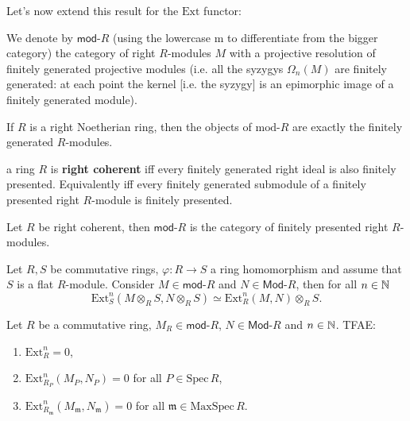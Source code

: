 Let's now extend this result for the $\mathrm{Ext}$ functor:
\begin{defn}
	We denote by $\mathsf{mod}\text{-}R$ (using the lowercase m to differentiate from the
	bigger category) the category of right $R$-modules $M$ with a projective
	resolution of finitely generated projective modules
	(i.e. all the syzygys $\Omega_n(M)$ are finitely generated:
	at each point the kernel [i.e. the syzygy] is an epimorphic image of a finitely generated module).
\end{defn}

\begin{rem}[]
	If $R$ is a right Noetherian ring, then
	the objects of $\mathrm{mod}\text{-}R$ are exactly the finitely generated $R$-modules.
\end{rem}

\begin{defn}
	a ring $R$ is \textbf{right coherent} iff every finitely generated right ideal
	is also finitely presented.
	Equivalently iff every finitely generated submodule of a finitely
	presented right $R$-module is finitely presented.
\end{defn}
\begin{rem}[]
	Let $R$ be right coherent, then
	$\mathsf{mod}\text{-}R$ is the category of finitely presented right $R$-modules.
\end{rem}

\begin{prop}
	Let $R,S$ be commutative rings, $\varphi: R \to S$ a ring homomorphism
	and assume that $S$ is a flat $R$-module.
	Consider $M \in \mathsf{mod}\text{-}R$ and $N \in \mathsf{Mod}\text{-}R$,
	then for all $n \in \mathbb{N}$
	\begin{equation}
		\mathrm{Ext}^n_S \left( M \otimes_R S, N \otimes_R S \right) \simeq
		\mathrm{Ext}^n_R \left( M,N \right) \otimes_R S
	.\end{equation} 
\end{prop} 

\begin{cor}
	Let $R$ be a commutative ring,
	$M_R \in \mathsf{mod}\text{-}R$, $N \in \mathsf{Mod}\text{-}R$ and $n \in \mathbb{N}$.
	TFAE:
	\begin{enumerate}
		\item $\mathrm{Ext}^n_R = 0$,
		\item $\mathrm{Ext}^{ n}_{ R_P} \left( M_P, N_P \right) = 0$ for all $P \in \mathrm{Spec}\, R$,
		\item $\mathrm{Ext}^{ n}_{ R_{\mathfrak{m}}} \left( M_{\mathfrak{m}}, N_{\mathfrak{m}} \right) = 0$
			for all $\mathfrak{m} \in \mathrm{MaxSpec}\, R$.
	\end{enumerate}
\end{cor} 

